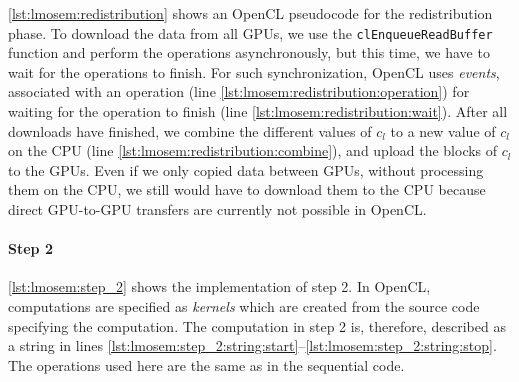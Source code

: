 \autoref{lst:lmosem:redistribution} shows an OpenCL pseudocode for the redistribution phase.
To download the data from all GPUs, we use the \texttt{clEnqueueReadBuffer} function and perform the operations asynchronously, but this time, we have to wait for the operations to finish.
For such synchronization, OpenCL uses \emph{events}, associated with an operation (line \autoref{lst:lmosem:redistribution:operation}) for waiting for the operation to finish (line \autoref{lst:lmosem:redistribution:wait}).
After all downloads have finished, we combine the different values of $c_l$ to a new value of $c_l$ on the CPU (line \autoref{lst:lmosem:redistribution:combine}), and upload the blocks of $c_l$ to the GPUs.
Even if we only copied data between GPUs, without processing them on the CPU, we still would have to download them to the CPU because direct GPU-to-GPU transfers are currently not possible in OpenCL.

\paragraph{Step 2}
\autoref{lst:lmosem:step_2} shows the implementation of step 2.
In OpenCL, computations are specified as \emph{kernels} which are created from the source code specifying the computation.
The computation in step 2 is, therefore, described as a string in lines \autoref{lst:lmosem:step_2:string:start}--\autoref{lst:lmosem:step_2:string:stop}.
The operations used here are the same as in the sequential code.

